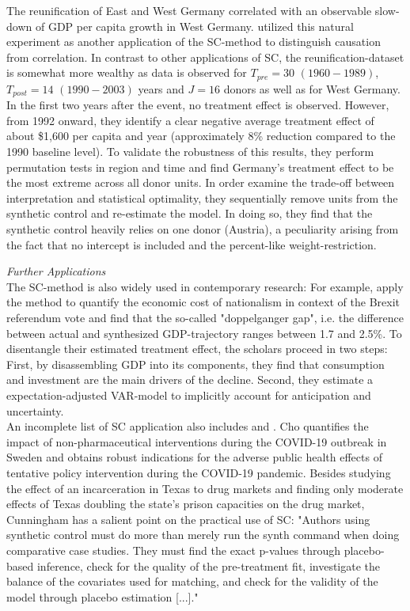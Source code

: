 The reunification of East and West Germany correlated with an observable slow-down of \ac{GDP} per capita growth in West Germany. \cite{abadie:2015} utilized this natural experiment as another application of the \ac{SC}-method to distinguish causation from correlation. In contrast to other applications of \ac{SC}, the reunification-dataset is somewhat more wealthy as data is observed for $T_{pre} = 30$ $(1960-1989)$, $T_{post} = 14$ $(1990-2003)$ years and $J = 16$ donors as well as for West Germany. In the first two years after the event, no treatment effect is observed. However, from 1992 onward, they identify a clear negative average treatment effect of about \$1,600 per capita and year (approximately 8\% reduction compared to the 1990 baseline level). To validate the robustness of this results, they perform permutation tests in region and time and find Germany's treatment effect to be the most extreme across all donor units. In order examine the trade-off between interpretation and statistical optimality, they sequentially remove units from the synthetic control and re-estimate the model. In doing so, they find that the synthetic control heavily relies on one donor (Austria), a peculiarity arising from the fact that no intercept is included and the percent-like weight-restriction.

\textit{Further Applications}\\
The \ac{SC}-method is also widely used in contemporary research: For example, \cite{born:2019} apply the method to quantify the economic cost of nationalism in context of the Brexit referendum vote and find that the so-called "doppelganger gap", i.e. the difference between actual and synthesized \ac{GDP}-trajectory ranges between 1.7 and 2.5\%. To disentangle their estimated treatment effect, the scholars proceed in two steps: First, by disassembling \ac{GDP} into its components, they find that consumption and investment are the main drivers of the decline. Second, they estimate a expectation-adjusted \ac{VAR}-model to implicitly account for anticipation and uncertainty. \\
An incomplete list of \ac{SC} application also includes \cite{cho:2020} and  \cite{cunningham:2021}. Cho quantifies the impact of non-pharmaceutical interventions during the COVID-19 outbreak in Sweden and obtains robust indications for the adverse public health effects of tentative policy intervention during the COVID-19 pandemic. Besides studying the effect of an incarceration in Texas to drug markets and finding only moderate effects of Texas doubling the state's prison capacities on the drug market, Cunningham has a salient point on the practical use of \ac{SC}: "Authors using synthetic control must do more than merely run the synth command when doing comparative case studies. They must find the exact p-values through placebo-based inference, check for the quality of the pre-treatment fit, investigate the balance of the covariates used for matching, and check for the validity of the model through placebo estimation [...]."

